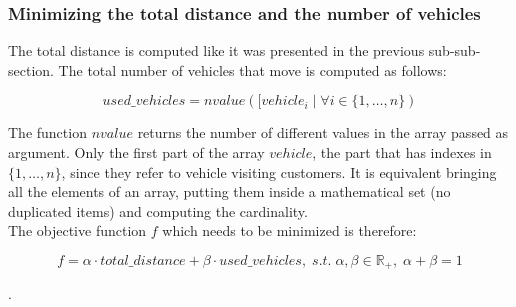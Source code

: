 \documentclass[../main.tex]{subfiles}
\begin{document}
\subsubsection{Minimizing the total distance and the number of vehicles}
The total distance is computed like it was presented in the previous sub-sub-section. The total number of vehicles that move is computed as follows:
\begin{center}
    \begin{equation}
        used\_vehicles = nvalue([vehicle_i \; | \; \forall i \in \{1,\dots,n\})
    \end{equation}
\end{center}
The function $nvalue$ returns the number of different values in the array passed as argument.
Only the first part of the array $vehicle$, the part that has indexes in $\{1,\dots,n\}$, since they refer to vehicle visiting customers.
It is equivalent bringing all the elements of an array, putting them inside a mathematical set (no duplicated items) and computing the cardinality.\\
The objective function $f$ which needs to be minimized is therefore:
\begin{center}
    \begin{equation}
        f = \alpha{} \cdot total\_distance + \beta{} \cdot used\_vehicles, \; s.t. \; \alpha{}, \beta{} \in \mathbb{R}_+, \; \alpha{} + \beta{} = 1
    \end{equation}
\end{center}.
\end{document}
